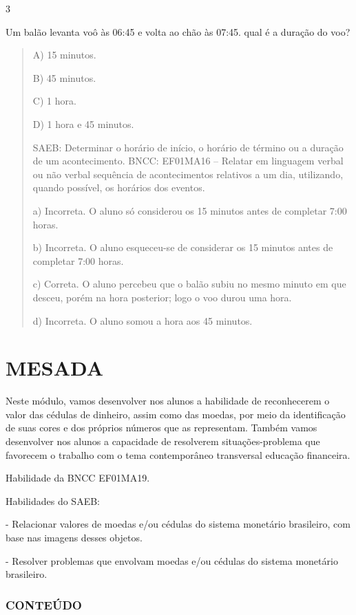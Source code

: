 \num{3}

Um balão levanta voô às 06:45 e volta ao chão às 07:45. qual é a duração
do voo?

\begin{quote}
A) 15 minutos.

B) 45 minutos.

C) 1 hora.

D) 1 hora e 45 minutos.

SAEB: Determinar o horário de início, o horário de término ou a
duração de um acontecimento.
BNCC: EF01MA16 -- Relatar em linguagem verbal ou não verbal sequência de
acontecimentos relativos a um dia, utilizando, quando possível, os
horários dos eventos.

a) Incorreta. O aluno só considerou os 15 minutos antes de
completar 7:00 horas.

b) Incorreta. O aluno esqueceu-se de considerar os 15 minutos antes de
completar 7:00 horas.

c) Correta. O aluno percebeu que o balão subiu no mesmo minuto em
que desceu, porém na hora posterior; logo o voo durou uma hora.

d) Incorreta. O aluno somou a hora aos 45 minutos.
\end{quote}

\chapter{MESADA}

Neste módulo, vamos desenvolver nos alunos a habilidade de reconhecerem o
valor das cédulas de dinheiro, assim como das moedas, por meio da
identificação de suas cores e dos próprios números que as representam.
Também vamos desenvolver nos alunos a capacidade de resolverem situações-problema que favorecem o trabalho com o tema contemporâneo transversal educação financeira.

Habilidade da BNCC
EF01MA19.

Habilidades do SAEB:

- Relacionar valores de moedas e/ou cédulas do sistema monetário
brasileiro, com base nas imagens desses objetos.

- Resolver problemas que envolvam moedas e/ou cédulas do sistema
monetário brasileiro.

\subsection{CONTEÚDO}\label{conteuxfado-4}

